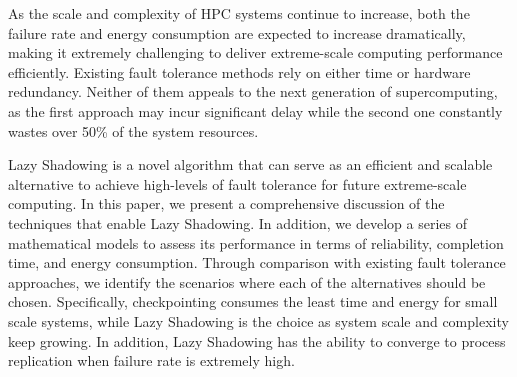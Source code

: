 As the scale and complexity of HPC systems continue to increase, both the failure rate and energy consumption are expected to increase dramatically, making it extremely challenging to deliver extreme-scale computing performance efficiently. Existing fault tolerance methods rely on either time or hardware redundancy. Neither of them appeals to the next generation of supercomputing, as the first approach may incur significant delay while the second one constantly wastes over 50\% of the system resources. %

Lazy Shadowing is a novel algorithm that can serve as an efficient and scalable alternative to achieve high-levels of fault tolerance for future extreme-scale computing. In this paper, we present a comprehensive discussion of the techniques that enable Lazy Shadowing. In addition, we develop a series of mathematical models to assess its performance in terms of reliability, completion time, and energy consumption. 
Through comparison with existing fault tolerance approaches, we identify the scenarios where each of the alternatives should be chosen. Specifically, checkpointing consumes the least time and energy for small scale systems, while Lazy Shadowing is the choice as system scale and complexity keep growing. In addition, Lazy Shadowing has the ability to converge to process replication when failure rate is extremely high. 

